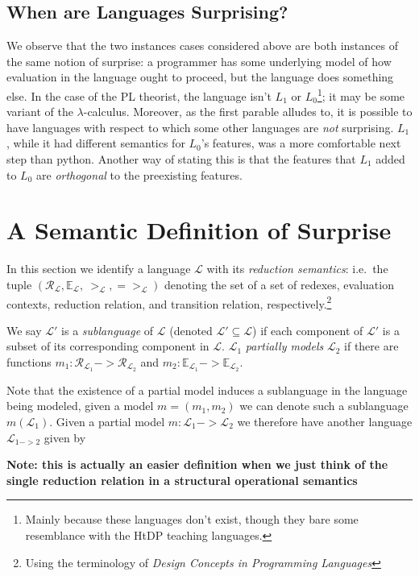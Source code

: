 \documentclass[12pt]{article}
\newcommand{\R}{\mathcal{R}}
\newcommand{\E}{\mathbb{E}}
\renewcommand{\L}{\mathcal{L}}
\begin{document}
\subsection{When are Languages Surprising?}

We observe that the two instances cases considered above are both instances of
the same notion of surprise: a programmer has some underlying model of how evaluation
in the language ought to proceed, but the language does something else. In the
case of the PL theorist, the language isn't $L_1$ or $L_0$\footnote{Mainly
  because these languages don't exist, though they bare some resemblance with the HtDP
  teaching languages.}; it may be some
variant of the $\lambda$-calculus. Moreover, as the first parable alludes to, it
is possible to have languages with respect to which some other languages are
\emph{not} surprising. $L_1$, while it had different semantics for $L_0$'s
features, was a more comfortable next step than python. Another way of stating
this is that the features that $L_1$ added to $L_0$ are \emph{orthogonal} to the
preexisting features.

\section{A Semantic Definition of Surprise}

In this section we identify a language $\L$ with its \emph{reduction semantics}:
i.e.~the tuple $(\R_\L, \E_\L, ~>_\L, =>_\L)$ denoting the set of a set of
redexes, evaluation contexts, reduction relation, and transition relation,
respectively.\footnote{Using the terminology of \textit{Design Concepts in
Programming Languages}}

We say $\L'$ is a \emph{sublanguage} of $\L$ (denoted $\L' \subseteq \L$) if
each component of $\L'$ is a subset of its corresponding component in $\L$.
$\L_1$ \emph{partially models} $\L_2$ if there are functions $m_1 : \R_{\L_1} ->
\R_{\L_2}$ and $m_2 : \E_{\L_1} -> \E_{\L_2}$.

Note that the existence of a partial model induces a sublanguage in the language
being modeled, given a model $m=(m_1,m_2)$ we can denote such a sublanguage $m(\L_1)$.
Given a partial model $m : \L_1 -> \L_2$  we therefore have another language
$\L_{1 -> 2}$ given by

\textbf{Note: this is actually an easier definition when we just think of the
single reduction relation in a structural operational semantics}
\end{document}
